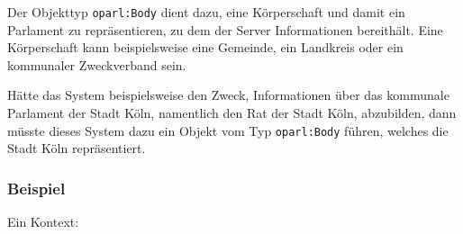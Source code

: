 \documentclass[,a4paper]{article}
\begin{document}
Der Objekttyp \texttt{oparl:Body} dient dazu, eine Körperschaft und
damit ein Parlament zu repräsentieren, zu dem der Server Informationen
bereithält. Eine Körperschaft kann beispielsweise eine Gemeinde, ein
Landkreis oder ein kommunaler Zweckverband sein.

Hätte das System beispielsweise den Zweck, Informationen über das
kommunale Parlament der Stadt Köln, namentlich den Rat der Stadt Köln,
abzubilden, dann müsste dieses System dazu ein Objekt vom Typ
\texttt{oparl:Body} führen, welches die Stadt Köln repräsentiert.

\subsubsection{Beispiel}\label{beispiel-1}

Ein Kontext:
\end{document}
